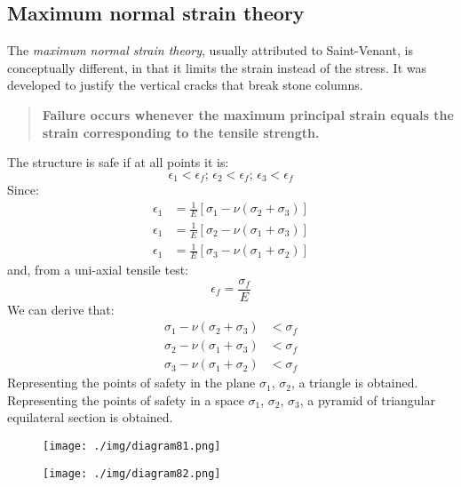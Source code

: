 \subsection{Maximum normal strain theory}
The \textit{maximum normal strain theory}, usually attributed to Saint-Venant, is conceptually different, in that it limits the strain instead of the stress. It was developed to justify the vertical cracks that break stone columns.
\begin{quotation}
  \textbf{Failure occurs whenever the maximum principal strain equals the strain corresponding to the tensile strength.}
\end{quotation}
The structure is safe if at all points it is:
\begin{equation}
  \epsilon_1 < \epsilon_f ; \, \epsilon_2 < \epsilon_f ; \, \epsilon_3 < \epsilon_f
\end{equation}
Since:
\begin{align}
  \epsilon_1 & = \frac{1}{E} \left[\sigma_1 - \nu \left(\sigma_2 + \sigma_3\right)\right] \\
  \epsilon_1 & = \frac{1}{E} \left[\sigma_2 - \nu \left(\sigma_1 + \sigma_3\right)\right] \\
  \epsilon_1 & = \frac{1}{E} \left[\sigma_3 - \nu \left(\sigma_1 + \sigma_2\right)\right]
\end{align}
and, from a uni-axial tensile test:
\begin{equation}
  \epsilon_f = \frac{\sigma_f}{E}
\end{equation}
We can derive that:
\begin{align}
  \sigma_1 - \nu \left(\sigma_2 + \sigma_3\right) & < \sigma_f \\
  \sigma_2 - \nu \left(\sigma_1 + \sigma_3\right) & < \sigma_f \\
  \sigma_3 - \nu \left(\sigma_1 + \sigma_2\right) & < \sigma_f
\end{align}
Representing the points of safety in the plane $\sigma_1$, $\sigma_2$, a triangle is obtained. Representing the points of safety in a space $\sigma_1$, $\sigma_2$, $\sigma_3$, a pyramid of triangular equilateral section is obtained.
\begin{figure}
  \begin{center}
    \begin{minipage}[b]{0.46\textwidth}
      \centering
      \texttt{[image: ./img/diagram81.png]}
      \caption{}
    \end{minipage}
    \begin{minipage}[b]{0.46\textwidth}
      \centering
      \texttt{[image: ./img/diagram82.png]}
      \caption{}
    \end{minipage}
  \end{center}
\end{figure}
